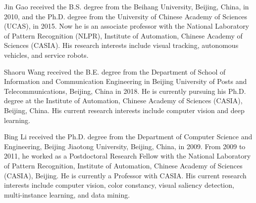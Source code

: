 \documentclass[journal]{IEEEtran}
\begin{document}
\begin{IEEEbiography}
{Jin Gao}
received the B.S. degree from the Beihang University, Beijing, China, in 2010, and the Ph.D. degree from the University of Chinese Academy of Sciences (UCAS), in 2015. Now he is an associate professor with the National Laboratory of Pattern Recognition (NLPR), Institute of Automation, Chinese Academy of Sciences (CASIA). His research interests include visual tracking, autonomous vehicles, and service robots.
\end{IEEEbiography}

\begin{IEEEbiography}
{Shaoru Wang}
received the B.E. degree from the Department of School of Information and Communication Engineering in Beijing University of Posts and Telecommunications, Beijing, China in 2018. He is currently pursuing his Ph.D. degree at the Institute of Automation, Chinese Academy of Sciences (CASIA), Beijing, China. His current research interests include computer vision and deep learning.
\end{IEEEbiography}

\begin{IEEEbiography}
{Bing Li}
received the Ph.D. degree from the Department of Computer Science and Engineering, Beijing Jiaotong University, Beijing, China, in 2009. From 2009 to 2011, he worked as a Postdoctoral Research Fellow with the National Laboratory of Pattern Recognition, Institute of Automation, Chinese Academy of Sciences (CASIA), Beijing. He is currently a Professor with CASIA. His current research interests include computer vision, color constancy, visual saliency detection, multi-instance learning, and data mining.
\end{IEEEbiography}
\end{document}
